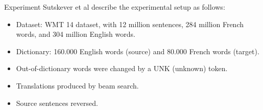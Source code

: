 \documentclass{beamer}
\begin{document}
\begin{frame}{Experiment}
 Sutskever et al describe the experimental setup as follows: 
\begin{itemize}
    \item Dataset: WMT 14 dataset, with 12 million sentences, 284 million French words, and 304 million English words.
    \item Dictionary: 160.000 English words (source) and 80.000 French words (target).
    \item Out-of-dictionary words were changed by a UNK (unknown) token.  
\item Translations produced by beam search. 
\item Source sentences reversed.
\end{itemize}
\end{frame}
\end{document}
